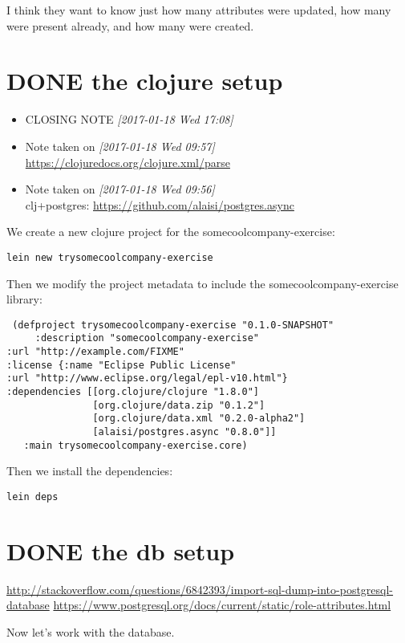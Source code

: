 \documentclass[11pt]{article}
\begin{document}
I think they want to know just how many attributes were updated, how
many were present already, and how many were created.
\section{{\bfseries\sffamily DONE} the clojure setup}
\label{sec:org98f28e3}
\begin{itemize}
\item CLOSING NOTE \textit{[2017-01-18 Wed 17:08]}
\item Note taken on \textit{[2017-01-18 Wed 09:57] } \\
\url{https://clojuredocs.org/clojure.xml/parse}
\item Note taken on \textit{[2017-01-18 Wed 09:56] } \\
clj+postgres: \url{https://github.com/alaisi/postgres.async}
\end{itemize}
We create a new clojure project for the somecoolcompany-exercise:
\begin{verbatim}
lein new trysomecoolcompany-exercise
\end{verbatim}

Then we modify the project metadata to include the somecoolcompany-exercise library:
\begin{verbatim}
 (defproject trysomecoolcompany-exercise "0.1.0-SNAPSHOT"
     :description "somecoolcompany-exercise"
:url "http://example.com/FIXME"
:license {:name "Eclipse Public License"
:url "http://www.eclipse.org/legal/epl-v10.html"}
:dependencies [[org.clojure/clojure "1.8.0"]
               [org.clojure/data.zip "0.1.2"]
               [org.clojure/data.xml "0.2.0-alpha2"]
               [alaisi/postgres.async "0.8.0"]]
   :main trysomecoolcompany-exercise.core)
\end{verbatim}

Then we install the dependencies:
\begin{verbatim}
lein deps
\end{verbatim}

\section{{\bfseries\sffamily DONE} the db setup}
\label{sec:org8dda4c6}
\url{http://stackoverflow.com/questions/6842393/import-sql-dump-into-postgresql-database}
\url{https://www.postgresql.org/docs/current/static/role-attributes.html}

Now let's work with the database.
\end{document}
